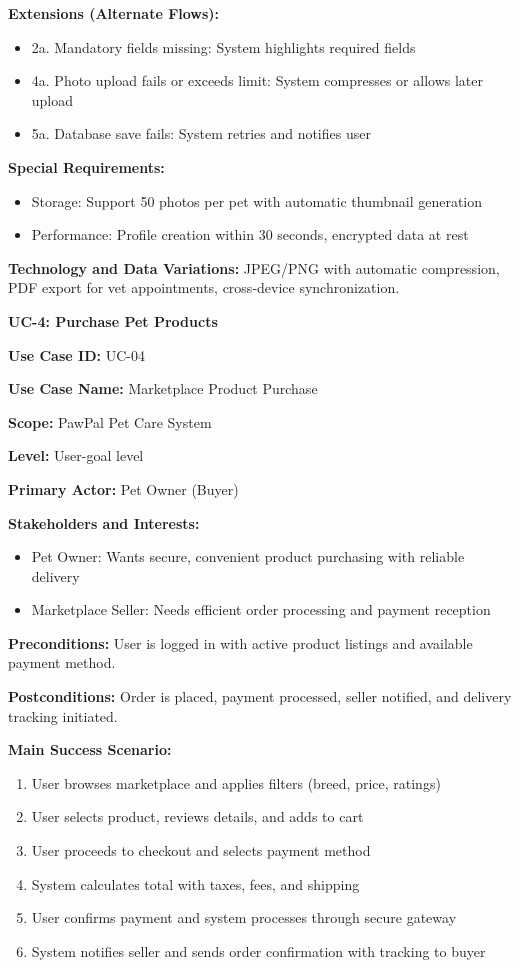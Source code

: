 \textbf{Extensions (Alternate Flows):}
\begin{itemize}
    \item 2a. Mandatory fields missing: System highlights required fields
    \item 4a. Photo upload fails or exceeds limit: System compresses or allows later upload
    \item 5a. Database save fails: System retries and notifies user
\end{itemize}

\textbf{Special Requirements:}
\begin{itemize}
    \item Storage: Support 50 photos per pet with automatic thumbnail generation
    \item Performance: Profile creation within 30 seconds, encrypted data at rest
\end{itemize}

\textbf{Technology and Data Variations:} JPEG/PNG with automatic compression, PDF export for vet appointments, cross-device synchronization.

\textbf{UC-4: Purchase Pet Products}

\textbf{Use Case ID:} UC-04

\textbf{Use Case Name:} Marketplace Product Purchase

\textbf{Scope:} PawPal Pet Care System

\textbf{Level:} User-goal level

\textbf{Primary Actor:} Pet Owner (Buyer)

\textbf{Stakeholders and Interests:}
\begin{itemize}
    \item Pet Owner: Wants secure, convenient product purchasing with reliable delivery
    \item Marketplace Seller: Needs efficient order processing and payment reception
\end{itemize}

\textbf{Preconditions:} User is logged in with active product listings and available payment method.

\textbf{Postconditions:} Order is placed, payment processed, seller notified, and delivery tracking initiated.

\textbf{Main Success Scenario:}
\begin{enumerate}
    \item User browses marketplace and applies filters (breed, price, ratings)
    \item User selects product, reviews details, and adds to cart
    \item User proceeds to checkout and selects payment method
    \item System calculates total with taxes, fees, and shipping
    \item User confirms payment and system processes through secure gateway
    \item System notifies seller and sends order confirmation with tracking to buyer
\end{enumerate}


